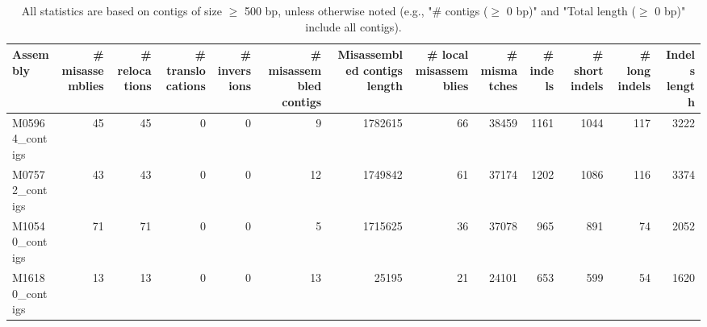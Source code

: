 \documentclass[12pt,a4paper]{article}
\begin{document}
\begin{table}[ht]
\begin{center}
\caption{All statistics are based on contigs of size $\geq$ 500 bp, unless otherwise noted (e.g., "\# contigs ($\geq$ 0 bp)" and "Total length ($\geq$ 0 bp)" include all contigs).}
\begin{tabular}{|l*{12}{|r}|}
\hline
Assembly & \# misassemblies &     \# relocations &     \# translocations &     \# inversions & \# misassembled contigs & Misassembled contigs length & \# local misassemblies & \# mismatches & \# indels &     \# short indels &     \# long indels & Indels length \\ \hline
M05964\_contigs & 45 & 45 & 0 & 0 & 9 & 1782615 & 66 & 38459 & 1161 & 1044 & 117 & 3222 \\ \hline
M07572\_contigs & 43 & 43 & 0 & 0 & 12 & 1749842 & 61 & 37174 & 1202 & 1086 & 116 & 3374 \\ \hline
M10540\_contigs & 71 & 71 & 0 & 0 & 5 & 1715625 & 36 & 37078 & 965 & 891 & 74 & 2052 \\ \hline
M16180\_contigs & 13 & 13 & 0 & 0 & 13 & 25195 & 21 & 24101 & 653 & 599 & 54 & 1620 \\ \hline
\end{tabular}
\end{center}
\end{table}
\end{document}
